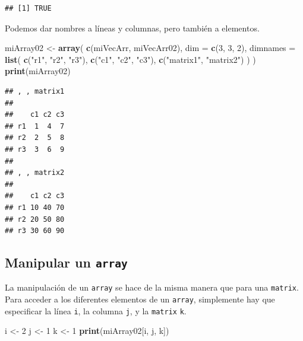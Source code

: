 \documentclass[]{book}
\newenvironment{Shaded}{\begin{snugshade}}{\end{snugshade}}
\newcommand{\KeywordTok}[1]{\textcolor[rgb]{0.13,0.29,0.53}{\textbf{#1}}}
\newcommand{\DataTypeTok}[1]{\textcolor[rgb]{0.13,0.29,0.53}{#1}}
\newcommand{\DecValTok}[1]{\textcolor[rgb]{0.00,0.00,0.81}{#1}}
\newcommand{\StringTok}[1]{\textcolor[rgb]{0.31,0.60,0.02}{#1}}
\newcommand{\NormalTok}[1]{#1}
\begin{document}
\begin{verbatim}
## [1] TRUE
\end{verbatim}

Podemos dar nombres a líneas y columnas, pero también a elementos.

\begin{Shaded}
\begin{Highlighting}[]
\NormalTok{miArray02 <-}\StringTok{ }\KeywordTok{array}\NormalTok{(}
  \KeywordTok{c}\NormalTok{(miVecArr, miVecArr02), }
  \DataTypeTok{dim =} \KeywordTok{c}\NormalTok{(}\DecValTok{3}\NormalTok{, }\DecValTok{3}\NormalTok{, }\DecValTok{2}\NormalTok{), }
  \DataTypeTok{dimnames =} \KeywordTok{list}\NormalTok{(}
    \KeywordTok{c}\NormalTok{(}\StringTok{"r1"}\NormalTok{, }\StringTok{"r2"}\NormalTok{, }\StringTok{"r3"}\NormalTok{), }
    \KeywordTok{c}\NormalTok{(}\StringTok{"c1"}\NormalTok{, }\StringTok{"c2"}\NormalTok{, }\StringTok{"c3"}\NormalTok{), }
    \KeywordTok{c}\NormalTok{(}\StringTok{"matrix1"}\NormalTok{, }\StringTok{"matrix2"}\NormalTok{)}
\NormalTok{  )}
\NormalTok{)}
\KeywordTok{print}\NormalTok{(miArray02)}
\end{Highlighting}
\end{Shaded}

\begin{verbatim}
## , , matrix1
## 
##    c1 c2 c3
## r1  1  4  7
## r2  2  5  8
## r3  3  6  9
## 
## , , matrix2
## 
##    c1 c2 c3
## r1 10 40 70
## r2 20 50 80
## r3 30 60 90
\end{verbatim}

\subsection{\texorpdfstring{Manipular un
\texttt{array}}{Manipular un array}}\label{manipular-un-array}

La manipulación de un \texttt{array} se hace de la misma manera que para
una \texttt{matrix}. Para acceder a los diferentes elementos de un
\texttt{array}, simplemente hay que especificar la línea \texttt{i}, la
columna \texttt{j}, y la \texttt{matrix} \texttt{k}.

\begin{Shaded}
\begin{Highlighting}[]
\NormalTok{i <-}\StringTok{ }\DecValTok{2}
\NormalTok{j <-}\StringTok{ }\DecValTok{1}
\NormalTok{k <-}\StringTok{ }\DecValTok{1}
\KeywordTok{print}\NormalTok{(miArray02[i, j, k])}
\end{Highlighting}
\end{Shaded}
\end{document}
